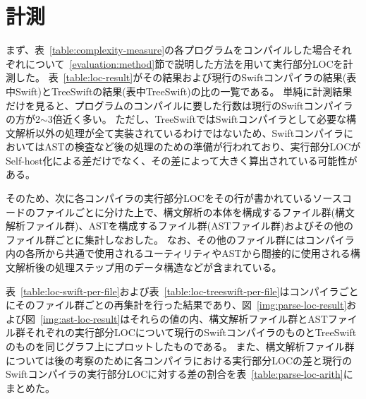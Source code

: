 \section{計測}
\label{evaluation:measure}

まず、表~\ref{table:complexity-measure}の各プログラムをコンパイルした場合それぞれについて~\ref{evaluation:method}節で説明した方法を用いて実行部分LOCを計測した。
表~\ref{table:loc-result}がその結果および現行のSwiftコンパイラの結果(表中Swift)とTreeSwiftの結果(表中TreeSwift)の比の一覧である。
単純に計測結果だけを見ると、プログラムのコンパイルに要した行数は現行のSwiftコンパイラの方が2$\sim$3倍近く多い。
ただし、TreeSwiftではSwiftコンパイラとして必要な構文解析以外の処理が全て実装されているわけではないため、SwiftコンパイラにおいてはASTの検査など後の処理のための準備が行われており、実行部分LOCがSelf-host化による差だけでなく、その差によって大きく算出されている可能性がある。

そのため、次に各コンパイラの実行部分LOCをその行が書かれているソースコードのファイルごとに分けた上で、構文解析の本体を構成するファイル群(構文解析ファイル群)、ASTを構成するファイル群(ASTファイル群)およびその他のファイル群ごとに集計しなおした。
なお、その他のファイル群にはコンパイラ内の各所から共通で使用されるユーティリティやASTから間接的に使用される構文解析後の処理ステップ用のデータ構造などが含まれている。

表~\ref{table:loc-swift-per-file}および表~\ref{table:loc-treeswift-per-file}はコンパイラごとにそのファイル群ごとの再集計を行った結果であり、図~\ref{img:parse-loc-result}および図~\ref{img:ast-loc-result}はそれらの値の内、構文解析ファイル群とASTファイル群それぞれの実行部分LOCについて現行のSwiftコンパイラのものとTreeSwiftのものを同じグラフ上にプロットしたものである。
また、構文解析ファイル群については後の考察のために各コンパイラにおける実行部分LOCの差と現行のSwiftコンパイラの実行部分LOCに対する差の割合を表~\ref{table:parse-loc-arith}にまとめた。

